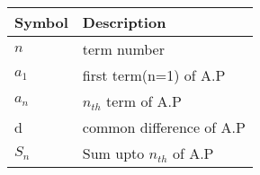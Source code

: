 \begin{tabular}{ | m{1.0cm} | m{4cm} | } 
  \hline
 Symbol & Description \\ 
 \hline
 $n$ & term number \\
 \hline
$a_1$& first term(n=1) of A.P \\
\hline
$a_n$ & $n_{th}$ term of A.P\\ 
\hline
 d & common difference of A.P \\
\hline
$S_n $& Sum upto $n_{th}$ of A.P \\
\hline

\end{tabular}\\
\caption{}
\label{Table:1}